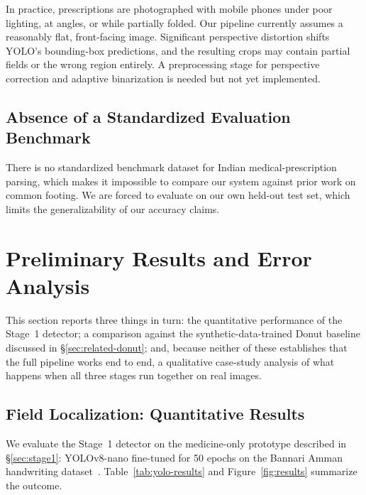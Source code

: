 \documentclass[conference]{IEEEtran}
\begin{document}
In practice, prescriptions are photographed with mobile phones under poor lighting, at angles, or while partially folded. Our pipeline currently assumes a reasonably flat, front-facing image. Significant perspective distortion shifts YOLO's bounding-box predictions, and the resulting crops may contain partial fields or the wrong region entirely. A preprocessing stage for perspective correction and adaptive binarization is needed but not yet implemented.

\subsection{Absence of a Standardized Evaluation Benchmark}

There is no standardized benchmark dataset for Indian medical-prescription parsing, which makes it impossible to compare our system against prior work on common footing. We are forced to evaluate on our own held-out test set, which limits the generalizability of our accuracy claims.

\section{Preliminary Results and Error Analysis}
\label{sec:results}

This section reports three things in turn: the quantitative performance of the Stage~1 detector; a comparison against the synthetic-data-trained Donut baseline discussed in \S\ref{sec:related-donut}; and, because neither of these establishes that the full pipeline works end to end, a qualitative case-study analysis of what happens when all three stages run together on real images.

\subsection{Field Localization: Quantitative Results}
\label{sec:quant-results}

We evaluate the Stage~1 detector on the medicine-only prototype described in \S\ref{sec:stage1}: YOLOv8-nano fine-tuned for 50 epochs on the Bannari Amman handwriting dataset~\cite{bannari2023handwritten}. Table~\ref{tab:yolo-results} and Figure~\ref{fig:results} summarize the outcome.
\end{document}
